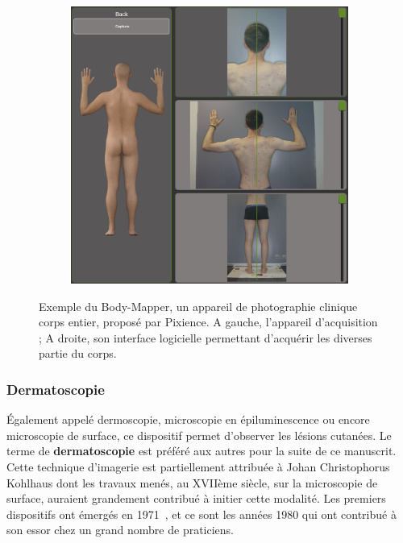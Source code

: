 \begin{figure}[H]
\begin{subfigure}{.28\textwidth}
    \end{subfigure}
    \begin{subfigure}{.65\textwidth}
      \centering
      \includegraphics[width=\linewidth]{contents/chapter_2/resources/example_device_bodymapper_2.png}
    \end{subfigure}
    \caption{Exemple du Body-Mapper, un appareil de photographie clinique corps entier, proposé par Pixience. A gauche, l'appareil d'acquisition ; A droite, son interface logicielle permettant d'acquérir les diverses partie du corps.}
    \label{fig:example_device_bodymapper}
\end{figure}\par


\subsubsection{Dermatoscopie}
Également appelé dermoscopie, microscopie en épiluminescence ou encore microscopie de surface, ce dispositif permet d’observer les lésions cutanées. Le terme de \textbf{dermatoscopie} est préféré aux autres pour la suite de ce manuscrit. Cette technique d’imagerie est partiellement attribuée à Johan Christophorus Kohlhaus dont les travaux menés, au XVIIème siècle, sur la microscopie de surface, auraient grandement contribué à initier cette modalité. Les premiers dispositifs ont émergés en 1971~\cite{MacKie1972}, et ce sont les années 1980 qui ont contribué à son essor chez un grand nombre de praticiens.\par

